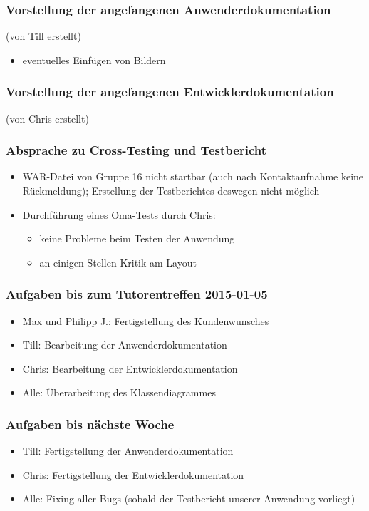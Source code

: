 \documentclass[12pt,a4paper]{article}
\begin{document}
\subsubsection*{Vorstellung der angefangenen Anwenderdokumentation}
(von Till erstellt)
\begin{itemize}
\item eventuelles Einfügen von Bildern
\end{itemize}

\subsubsection*{Vorstellung der angefangenen Entwicklerdokumentation}
(von Chris erstellt)

\subsubsection*{Absprache zu Cross-Testing und Testbericht}
\begin{itemize}
\item WAR-Datei von Gruppe 16 nicht startbar (auch nach Kontaktaufnahme keine Rückmeldung); Erstellung der Testberichtes deswegen nicht möglich
\item Durchführung eines Oma-Tests durch Chris:
\begin{itemize}
\item keine Probleme beim Testen der Anwendung
\item an einigen Stellen Kritik am Layout
\end{itemize}
\end{itemize}

\subsubsection*{Aufgaben bis zum Tutorentreffen 2015-01-05}
\begin{itemize}
\item Max und Philipp J.: Fertigstellung des Kundenwunsches
\item Till: Bearbeitung der Anwenderdokumentation
\item Chris: Bearbeitung der Entwicklerdokumentation
\item Alle: Überarbeitung des Klassendiagrammes
\end{itemize}

\subsubsection*{Aufgaben bis nächste Woche}
\begin{itemize}
\item Till: Fertigstellung der Anwenderdokumentation
\item Chris: Fertigstellung der Entwicklerdokumentation
\item Alle: Fixing aller Bugs (sobald der Testbericht unserer Anwendung vorliegt)
\end{itemize}
\end{document}
